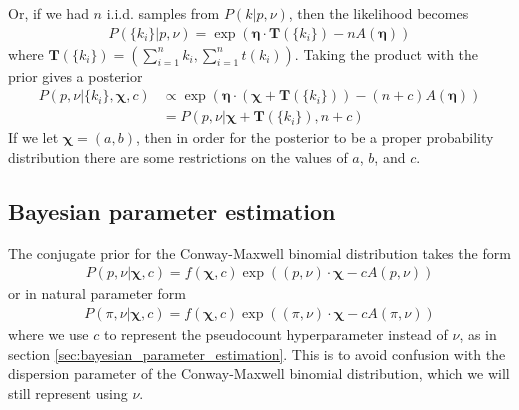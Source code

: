 \documentclass[a4paper,12pt]{article}
\theoremstyle{definition}
\begin{document}
Or, if we had $n$ i.i.d. samples from $P(k | p, \nu)$, then the likelihood becomes
\begin{align}
  P(\lbrace k_i \rbrace | p, \nu) = \exp \left( \boldsymbol{\eta} \cdot \mathbf{T}(\lbrace k_i \rbrace) - nA(\boldsymbol{\eta}) \right)
\end{align}
where $\mathbf{T}(\lbrace k_i \rbrace) = \left( \sum_{i=1}^n k_i, \sum_{i=1}^n t(k_i)\right)$. Taking the product with the prior gives a posterior 
\begin{align}
  P(p, \nu | \lbrace k_i \rbrace, \boldsymbol{\chi}, c) & \propto \exp \left(\boldsymbol{\eta} \cdot \left( \boldsymbol{\chi} + \mathbf{T}(\lbrace k_i \rbrace) \right) - (n + c)A(\boldsymbol{\eta}) \right) \\
  & = P(p, \nu | \boldsymbol{\chi} + \mathbf{T}(\lbrace k_i \rbrace), n + c)
\end{align}
If we let $\boldsymbol{\chi} = (a,b)$, then in order for the posterior to be a proper probability distribution there are some restrictions on the values of $a$, $b$, and $c$.

\subsection{Bayesian parameter estimation}
The conjugate prior for the Conway-Maxwell binomial distribution takes the form
\begin{align}
  P(p, \nu | \boldsymbol{\chi}, c) = f(\boldsymbol{\chi}, c) \exp \left((p, \nu) \cdot \boldsymbol{\chi} - c A(p, \nu)\right)
\end{align}
or in natural parameter form 
\begin{align}
  P(\pi, \nu | \boldsymbol{\chi}, c) = f(\boldsymbol{\chi}, c) \exp \left((\pi, \nu) \cdot \boldsymbol{\chi} - c A(\pi, \nu)\right)
\end{align}
where we use $c$ to represent the pseudocount hyperparameter instead of $\nu$, as in section \ref{sec:bayesian_parameter_estimation}. This is to avoid confusion with the dispersion parameter of the Conway-Maxwell binomial distribution, which we will still represent using $\nu$.
\end{document}
